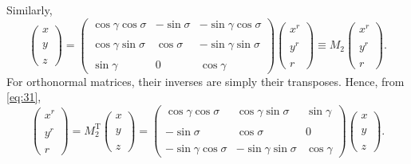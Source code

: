 \documentclass[12pt]{report}
\begin{document}
Similarly, 
\begin{equation}
\label{eq:31}
  \left(\begin{matrix} x\\ \\ y\\ \\ z\end{matrix}\right) = 
  \left(\begin{matrix}\cos\gamma\cos\sigma & -\sin\sigma &
      -\sin\gamma\cos\sigma \\ \\
  \cos\gamma\sin\sigma & \cos\sigma & -\sin\gamma\sin\sigma \\ \\
  \sin\gamma & 0 & \cos\gamma\end{matrix}\right) 
  \left(\begin{matrix}x^r \\ \\ y^r \\ \\ r\end{matrix}\right) \equiv
  M_2 \left(\begin{matrix}x^r \\ \\ y^r \\ \\ r\end{matrix}\right).
\end{equation}
For orthonormal matrices, their inverses are simply their
transposes. Hence, from \eqref{eq:31},
\begin{equation}
\label{eq:32}
  \left(\begin{matrix} x^r\\ \\ y^r\\ \\ r\end{matrix}\right) =
  M_2^\textrm{T} \left(\begin{matrix}x \\ \\ y \\ \\
      z\end{matrix}\right) =
  \left(\begin{matrix}\cos\gamma\cos\sigma & \cos\gamma\sin\sigma &
      \sin\gamma \\ \\
  -\sin\sigma & \cos\sigma & 0\\ \\
  -\sin\gamma\cos\sigma & -\sin\gamma\sin\sigma &
  \cos\gamma\end{matrix}\right)  
  \left(\begin{matrix}x \\ \\ y \\ \\ z\end{matrix}\right).
\end{equation}
\end{document}

